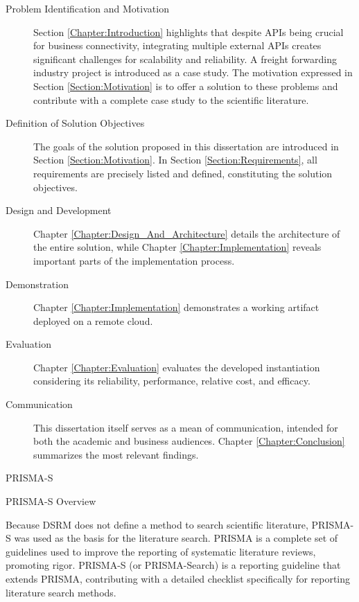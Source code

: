 \documentclass[12pt, reqno, oneside]{amsbook}
\makeatletter
\def\section{\@startsection{section}{1}%
      \z@{.5\linespacing\@plus.7\linespacing}{.25\linespacing}%
      {\normalfont\bfseries\flushleft}}
\def\subsection{\@startsection{subsection}{2}%
      \z@{.5\linespacing\@plus.7\linespacing}{.25\linespacing}%
      {\normalfont\bfseries\flushleft}}
\theoremstyle{definition}
\theoremstyle{definition}
\numberwithin{section}{chapter}
\numberwithin{table}{chapter}
\numberwithin{figure}{chapter}
\makeatother
\begin{document}
\begin{description}
  \item [Problem Identification and Motivation] Section \ref{Chapter:Introduction} highlights that despite \acp{API} being crucial for business connectivity, integrating multiple external \acp{API} creates significant challenges for scalability and reliability. A freight forwarding industry project is introduced as a case study. The motivation expressed in Section \ref{Section:Motivation} is to offer a solution to these problems and contribute with a complete case study to the scientific literature.
  \item [Definition of Solution Objectives] The goals of the solution proposed in this dissertation are introduced in Section \ref{Section:Motivation}. In Section \ref{Section:Requirements}, all requirements are precisely listed and defined, constituting the solution objectives.
  \item [Design and Development] Chapter \ref{Chapter:Design_And_Architecture} details the architecture of the entire solution, while Chapter \ref{Chapter:Implementation} reveals important parts of the implementation process.
  \item [Demonstration] Chapter \ref{Chapter:Implementation} demonstrates a working artifact deployed on a remote cloud.
  \item [Evaluation] Chapter \ref{Chapter:Evaluation} evaluates the developed instantiation considering its reliability, performance, relative cost, and efficacy.
  \item [Communication] This dissertation itself serves as a mean of communication, intended for both the academic and business audiences. Chapter \ref{Chapter:Conclusion} summarizes the most relevant findings.
\end{description}

\section{PRISMA-S}

\subsection{PRISMA-S Overview}
\label{Subsection:PRISMA_S_Overview}

Because \ac{DSRM} does not define a method to search scientific literature, PRISMA-S was used as the basis for the literature search. \ac{PRISMA} is a complete set of guidelines used to improve the reporting of systematic literature reviews, promoting rigor. PRISMA-S (or PRISMA-Search) is a reporting guideline that extends PRISMA, contributing with a detailed checklist specifically for reporting literature search methods.
\end{document}
